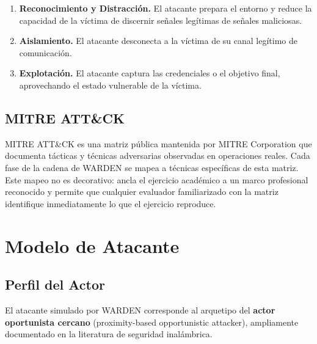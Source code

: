 \documentclass[11pt,a4paper]{article}
\begin{document}
\begin{enumerate}
  \item \textbf{Reconocimiento y Distracción.} El atacante prepara el
    entorno y reduce la capacidad de la víctima de discernir señales
    legítimas de señales maliciosas.
  \item \textbf{Aislamiento.} El atacante desconecta a la víctima de su
    canal legítimo de comunicación.
  \item \textbf{Explotación.} El atacante captura las credenciales o el
    objetivo final, aprovechando el estado vulnerable de la víctima.
\end{enumerate}

\subsection{MITRE ATT\&CK}
MITRE ATT\&CK es una matriz pública mantenida por MITRE Corporation que
documenta tácticas y técnicas adversarias observadas en operaciones reales.
Cada fase de la cadena de WARDEN se mapea a técnicas específicas de esta
matriz. Este mapeo no es decorativo: ancla el ejercicio académico a un marco
profesional reconocido y permite que cualquier evaluador familiarizado con
la matriz identifique inmediatamente lo que el ejercicio reproduce.

\section{Modelo de Atacante}

\subsection{Perfil del Actor}
El atacante simulado por WARDEN corresponde al arquetipo del
\textbf{actor oportunista cercano} (proximity-based opportunistic attacker),
ampliamente documentado en la literatura de seguridad inalámbrica.
\end{document}
